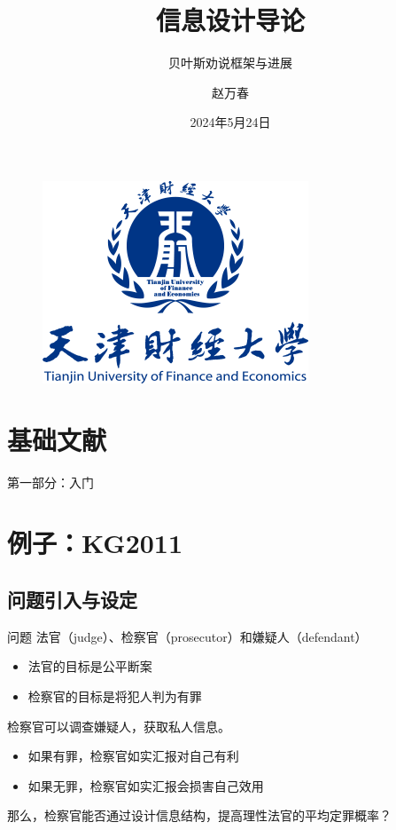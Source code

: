 \documentclass{beamer}
\author{赵万春}
\title{信息设计导论}
\subtitle{贝叶斯劝说框架与进展}
\institute{天津财经大学 金融学院}
\date{2024年5月24日}
\begin{document}
\kaishu

\begin{frame}
	\titlepage
	\begin{figure}[htpb]
		\begin{center}
			\includegraphics[width=0.2\linewidth]{pic/TJUFE_logo.png}
		\end{center}
	\end{figure}
\end{frame}	

\section{基础文献}
\begin{frame}{第一部分：入门}
	
\end{frame}

\section{例子：KG2011}

\subsection{问题引入与设定}

\begin{frame}{问题}
	法官（judge）、检察官（prosecutor）和嫌疑人（defendant）
	\begin{itemize}
		\item 法官的目标是公平断案
		\item 检察官的目标是将犯人判为有罪
	\end{itemize}
	检察官可以调查嫌疑人，获取私人信息。\\
	\begin{itemize}
		\item 如果有罪，检察官如实汇报对自己有利
		\item 如果无罪，检察官如实汇报会损害自己效用
	\end{itemize}
	那么，检察官能否通过设计信息结构，提高理性法官的平均定罪概率？
\end{frame}
\end{document}
